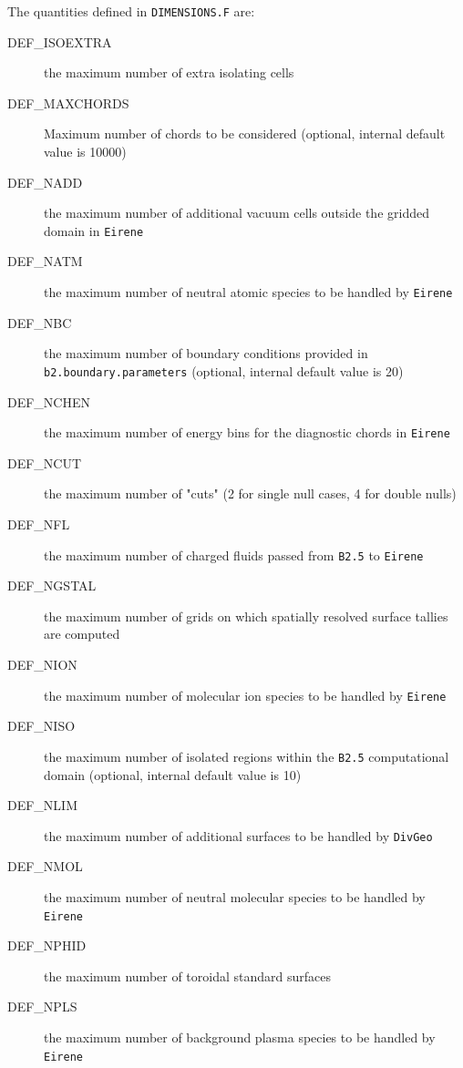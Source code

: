 \documentclass[a4paper,10pt]{report}
\begin{document}
The quantities defined in {\tt DIMENSIONS.F} are:
\begin{description}
\item[DEF\_ISOEXTRA] the maximum
number of extra isolating cells
\item[DEF\_MAXCHORDS]  Maximum number of chords to be considered (optional, internal default value is 10000)
\item[DEF\_NADD] the maximum number of
additional vacuum cells outside the gridded domain in {\tt Eirene}
\item[DEF\_NATM] the maximum number of
neutral atomic species to be handled by {\tt Eirene}
\item[DEF\_NBC] the maximum number of boundary conditions provided in {\tt b2.boundary.parameters} (optional, internal default value is 20)
\item[DEF\_NCHEN] the maximum number of
energy bins for the diagnostic chords in {\tt Eirene}
\item[DEF\_NCUT] the maximum number of
"cuts" (2 for single null cases, 4 for double nulls)
\item[DEF\_NFL] the maximum number of charged fluids
passed from {\tt B2.5} to {\tt Eirene}
\item[DEF\_NGSTAL] the maximum number
of grids on which spatially resolved surface tallies are computed
\item[DEF\_NION] the maximum number of molecular
ion species to be handled by {\tt Eirene}
\item[DEF\_NISO] the maximum number of isolated regions within the {\tt B2.5} computational domain (optional, internal default value is 10)
\item[DEF\_NLIM] the maximum number of
additional surfaces to be handled by {\tt DivGeo}
\item[DEF\_NMOL] the maximum number of
neutral molecular species to be handled by {\tt Eirene}
\item[DEF\_NPHID] the maximum number of
toroidal standard surfaces
\item[DEF\_NPLS] the maximum number of background
plasma species to be handled by {\tt Eirene}

\end{description}
\end{document}
